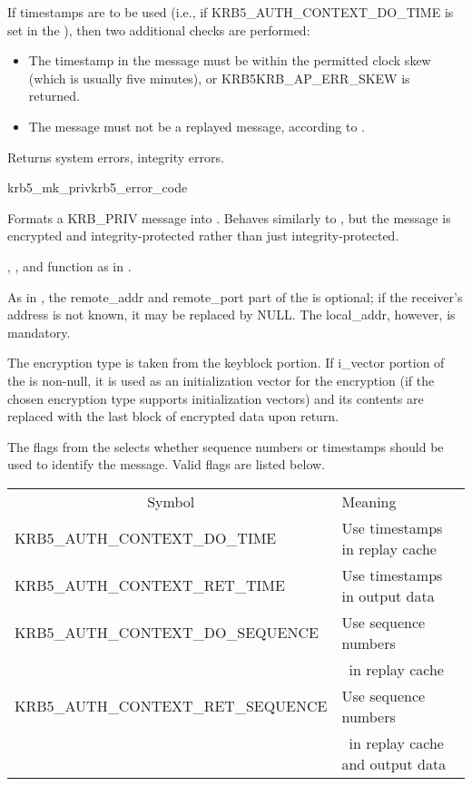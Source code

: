 If timestamps are to be used (i.e., if KRB5_AUTH_CONTEXT_DO_TIME is set
in the ), then two additional checks are performed:
\begin{itemize}
\item The timestamp in the message must be within the permitted clock
	skew (which is usually five minutes), or KRB5KRB_AP_ERR_SKEW
	is returned.
\item The message must not be a replayed message, according to
	.
\end{itemize}

Returns system errors, integrity errors.

\begin{funcdecl}{krb5_mk_priv}{krb5_error_code}{\funcinout}
\funcin
{}
\funcout
{}
\end{funcdecl}

Formats a KRB_PRIV message into .  Behaves similarly
to , but the message is encrypted and
integrity-protected rather than just integrity-protected.

, , 
 and
 function as in .

As in , the remote_addr and remote_port part of
the  is optional; if the receiver's address is
not known, it may be replaced by NULL.  The local_addr, however, is
mandatory.

The encryption type is taken from the  keyblock
portion. If i_vector portion of the 
is non-null, it is used as an initialization vector for the encryption
(if the chosen encryption type supports initialization vectors)
and its contents are replaced with the last block of encrypted data
upon return.

The flags from the  selects whether sequence numbers or timestamps
should be used to identify the message.  Valid flags are listed below.

\begin{tabular}{ll}
\multicolumn{1}{c}{Symbol} & Meaning \\
KRB5_AUTH_CONTEXT_DO_TIME& Use timestamps in replay cache\\
KRB5_AUTH_CONTEXT_RET_TIME& Use timestamps in output data\\
KRB5_AUTH_CONTEXT_DO_SEQUENCE& Use sequence numbers\\
	&\ in replay cache\\
KRB5_AUTH_CONTEXT_RET_SEQUENCE& Use sequence numbers\\
	&\ in replay cache and output data \\
\end{tabular}

